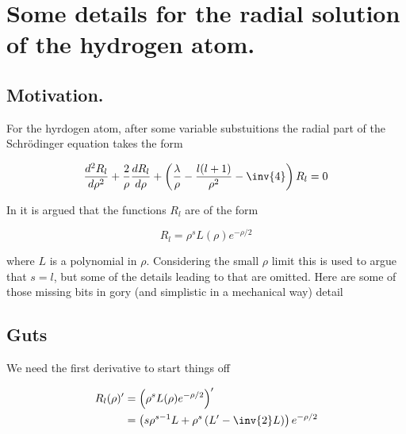 
%

\chapter{Some details for the radial solution of the hydrogen atom.}
\label{chap:hyrdogenLaguerre}
{}
\date{Nov 24, 2010}

\beginArtWithToc

\section{Motivation.}

For the hyrdogen atom, after some variable substuitions the radial part of the Schr\"{o}dinger equation takes the form

\begin{equation}\label{eqn:hyrdogenLaguerre:10}
\frac{d^2 R_l}{d\rho^2} + \frac{2}{\rho} \frac{d R_l}{d\rho} + \left( \frac{\lambda}{\rho} - \frac{l(l+1)}{\rho^2} - \inv{4} \right) R_l = 0
\end{equation}

In \cite{desai2009quantum} it is argued that the functions $R_l$ are of the form

\begin{equation}\label{eqn:hyrdogenLaguerre:20}
R_l = \rho^s L(\rho) e^{-\rho/2}
\end{equation}

where $L$ is a polynomial in $\rho$.  Considering the small $\rho$ limit this is used to argue that $s=l$, but some of the details leading to that are omitted.  Here are some of those missing bits in gory (and simplistic in a mechanical way) detail

\section{Guts}

We need the first derivative to start things off

\begin{align*}
R_l(\rho)'
&= \left( \rho^s L(\rho) e^{-\rho/2} \right)' \\
&= \left( s \rho^{s-1} L + \rho^s \left(L' - \inv{2} L\right) \right) e^{-\rho/2} \\
\end{align*}

